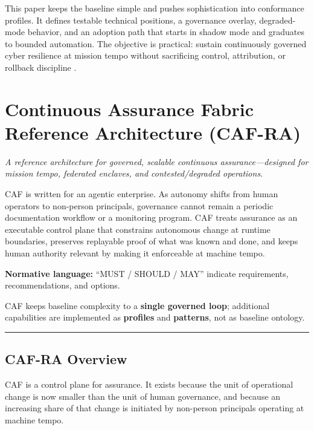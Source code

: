 \documentclass[11pt]{article}
\begin{document}
\begin{execsummary}
This paper keeps the baseline simple and pushes sophistication into conformance profiles. It defines testable technical positions, a governance overlay, degraded-mode behavior, and an adoption path that starts in shadow mode and graduates to bounded automation. The objective is practical: sustain continuously governed cyber resilience at mission tempo without sacrificing control, attribution, or rollback discipline \cite{ACPRA,DADMemo,CodeAsPolicy}.
\end{execsummary}

\hypertarget{continuous-assurance-fabric-reference-architecture-cafra}{%
\section{Continuous Assurance Fabric Reference Architecture (CAF-RA)}\label{continuous-assurance-fabric-reference-architecture-cafra}}

\emph{A reference architecture for governed, scalable continuous
assurance---designed for mission tempo, federated enclaves, and
contested/degraded operations.}

CAF is written for an agentic enterprise. As autonomy shifts from human operators to non-person principals, governance cannot remain a periodic documentation workflow or a monitoring program. CAF treats assurance as an executable control plane that constrains autonomous change at runtime boundaries, preserves replayable proof of what was known and done, and keeps human authority relevant by making it enforceable at machine tempo.

\textbf{Normative language:} ``MUST / SHOULD / MAY'' indicate requirements, recommendations, and options.

CAF keeps baseline complexity to a \textbf{single governed loop}; additional capabilities are implemented as \textbf{profiles} and \textbf{patterns}, not as baseline ontology.

\begin{center}\rule{0.5\linewidth}{0.5pt}\end{center}

\hypertarget{cafra-at-a-glance}{%
\subsection{CAF-RA Overview}\label{cafra-at-a-glance}}

CAF is a control plane for assurance. It exists because the unit of operational change is now smaller than the unit of human governance, and because an increasing share of that change is initiated by non-person principals operating at machine tempo.
\end{document}
